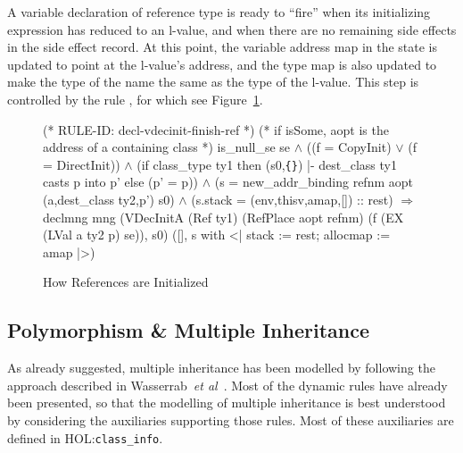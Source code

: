 \documentclass[11pt]{article}
\newcommand{\lbr}{\texttt{\{}}
\newcommand{\rbr}{\texttt{\}}}
\newcommand{\HOLfile}[1]{HOL:\texttt{#1}}
\begin{document}
A variable declaration of reference type is ready to ``fire'' when its
initializing expression has reduced to an l-value, and when there are
no remaining side effects in the side effect record.  At this point,
the variable address map in the state is updated to point at the
l-value's address, and the type map is also updated to make the type
of the name the same as the type of the l-value.
This step is controlled by the rule ,
for which see Figure~\ref{fig:decl-vdecinit-finish-ref}.
\begin{figure}[hbtp]
%
\begin{stdrule}
(* RULE-ID: decl-vdecinit-finish-ref *)
(* if isSome, aopt is the address of a containing class *)
     is_null_se se \(\land\)
     ((f = CopyInit) \(\lor\) (f = DirectInit)) \(\land\)
     (if class_type ty1 then
        (s0,\lbr\rbr) |- dest_class ty1 casts p into p'
      else (p' = p)) \(\land\)
     (s = new_addr_binding refnm aopt (a,dest_class ty2,p') s0) \(\land\)
     (s.stack = (env,thisv,amap,[]) :: rest)
   \(\Rightarrow\)
     declmng mng
             (VDecInitA (Ref ty1)
                        (RefPlace aopt refnm)
                        (f (EX (LVal a ty2 p) se)), s0)
             ([], s with <| stack := rest; allocmap := amap |>)
\end{stdrule}
\caption{How References are Initialized}
\label{fig:decl-vdecinit-finish-ref}
\end{figure}




\subsection{Polymorphism \& Multiple Inheritance}
\label{sec:multiple-inheritance}

As already suggested, multiple inheritance has been modelled by
following the approach described in Wasserrab~\emph{et
  al}~\cite{wasserrab-nst-OOPSLA06}.  Most of the dynamic rules have
already been presented, so that the modelling of multiple inheritance
is best understood by considering the auxiliaries supporting those
rules.  Most of these auxiliaries are defined in
\HOLfile{class_info}.

\newcommand{\fld}{\texttt{fld}}
\newcommand{\Cs}{\texttt{Cs}}
\end{document}

